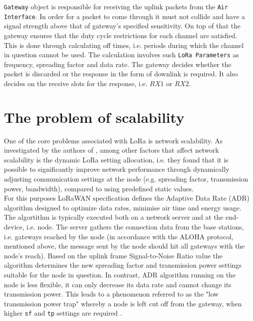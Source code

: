 \texttt{Gateway} object is responsible for receiving 
the uplink packets from the \texttt{Air Interface}. In order for a packet to come through it must not collide and have  a signal strength above that of gateway's specified sensitivity. On top of that the gateway ensures that the duty cycle restrictions for each channel are satisfied. This is done through
calculating off times, i.e. periods during which the 
channel in question cannot be used. The calculation
involves such \texttt{LoRa Parameters} as frequency,
spreading factor and data rate. The gateway decides 
whether the packet is discarded or the response in 
the form of downlink is required. It also decides on the
receive slots for the response, i.e. $RX1$ or $RX2$.\\


\section{The problem of scalability}

One of the core problems associated with LoRa is network 
scalability. As investigated by the authors of
\cite{collision_conditions}, among other factors that
affect network scalability is the dynamic LoRa setting
allocation, i.e. they found that it is possible
to significantly improve network performance through
dynamically adjusting communication settings at the
node (e.g. spreading factor, transmission power, bandwidth), compared to using predefined static values.\\

For this purposes LoRaWAN specification 
\cite{lorawan_spec} defines the Adaptive Data Rate
(ADR) algorithm designed to optimize data rates, minimise air time and energy usage. The algortithm
is typically executed both on a network server and at the 
end-device, i.e. node. 
The server gathers the connection data from the base stations, i.e. gateways reached by the node (in accordance with the ALOHA protocol, mentioned above, the message 
sent by the node should hit all gateways
with the node's reach). Based on the uplink frame Signal-to-Noise Ratio value the algorithm determines the new
spreading factor and transmission power settings suitable
for the node in question. In contrast, ADR algorithm running on the node is less flexible, it can only decrease its
data rate and cannot change its transmission power.
This leads to a phenomenon referred to as the "low 
transmission power trap" \cite{low_power_trap} whereby a
node is left cut off from the gateway, when higher \texttt{sf} and \texttt{tp} settings are required .\\

